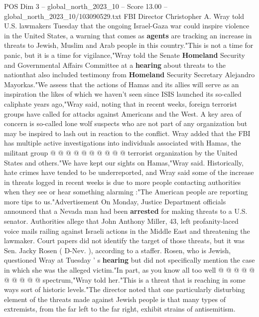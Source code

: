 \begin{textsample}{POS Dim 3 – global\_north\_2023\_10 – Score 13.00 – global\_north\_2023\_10/103090529.txt}  \label{ex:f3_pos_274}
FBI Director Christopher A.
Wray told U.S. lawmakers Tuesday that the ongoing Israel-Gaza war could inspire violence in the United States, a warning that comes as \textbf{agents} are tracking an increase in threats to Jewish, Muslim and Arab people in this country."This is not a time for panic, but it is a time for vigilance,"Wray told the Senate \textbf{Homeland} Security and Governmental Affairs Committee at a \textbf{hearing} about threats to the nationthat also included testimony from \textbf{Homeland} Security Secretary Alejandro Mayorkas."We assess that the actions of Hamas and its allies will serve as an inspiration the likes of which we haven't seen since ISIS launched its so-called caliphate years ago,"Wray said, noting that in recent weeks, foreign terrorist groups have called for attacks against Americans and the West.
A key area of concern is so-called lone wolf suspects who are not part of any organization but may be inspired to lash out in reaction to the conflict.
Wray added that the FBI has multiple active investigations into individuals associated with Hamas, the militant group @ @ @ @ @ @ @ @ @ @ terrorist organization by the United States and others."We have kept our sights on Hamas,"Wray said.
Historically, hate crimes have tended to be underreported, and Wray said some of the increase in threats logged in recent weeks is due to more people contacting authorities when they see or hear something alarming :"The American people are reporting more tips to us."Advertisement On Monday, Justice Department officials announced that a Nevada man had been \textbf{arrested} for making threats to a U.S. senator.
Authorities allege that John Anthony Miller, 43, left profanity-laced voice mails railing against Israeli actions in the Middle East and threatening the lawmaker.
Court papers did not identify the target of those threats, but it was Sen.
Jacky Rosen ( D-Nev. ), according to a staffer.
Rosen, who is Jewish, questioned Wray at Tuesday ' s \textbf{hearing} but did not specifically mention the case in which she was the alleged victim."In part, as you know all too well @ @ @ @ @ @ @ @ @ @ spectrum,"Wray told her."This is a threat that is reaching in some ways sort of historic levels."The director noted that one particularly disturbing element of the threats made against Jewish people is that many types of extremists, from the far left to the far right, exhibit strains of antisemitism.

\end{textsample}
